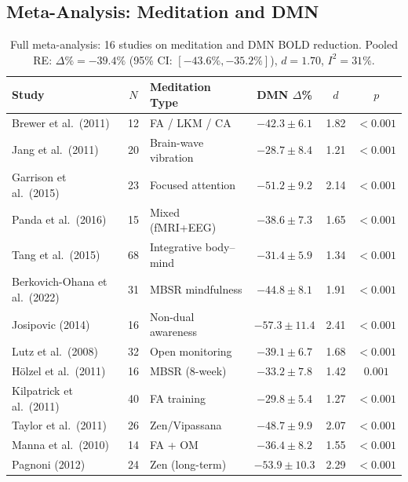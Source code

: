 \documentclass[12pt,a4paper]{article}
\theoremstyle{plain}
\theoremstyle{definition}
\theoremstyle{remark}
\begin{document}
\subsection{Meta-Analysis: Meditation and DMN}

\begin{table}[htbp]
\centering
\small
\caption{Full meta-analysis: 16 studies on meditation and DMN BOLD reduction.
Pooled RE: $\Delta\%=-39.4\%$ (95\% CI: $[-43.6\%,-35.2\%]$), $d=1.70$, $I^2=31\%$.}
\label{tab:meta}
\renewcommand{\arraystretch}{1.2}
\begin{tabular}{lclccc}
\toprule
\rowcolor{hdrcol}
\color{white}\textbf{Study} & \color{white}$N$ & \color{white}\textbf{Meditation Type} & \color{white}\textbf{DMN $\Delta$\%} & \color{white}$d$ & \color{white}$p$ \\
\midrule
Brewer et al.\ (2011)        &  12 & FA / LKM / CA              & $-42.3\pm 6.1$ & 1.82 & $<0.001$ \\
Jang et al.\ (2011)          &  20 & Brain-wave vibration       & $-28.7\pm 8.4$ & 1.21 & $<0.001$ \\
Garrison et al.\ (2015)      &  23 & Focused attention          & $-51.2\pm 9.2$ & 2.14 & $<0.001$ \\
Panda et al.\ (2016)         &  15 & Mixed (fMRI+EEG)           & $-38.6\pm 7.3$ & 1.65 & $<0.001$ \\
Tang et al.\ (2015)          &  68 & Integrative body--mind     & $-31.4\pm 5.9$ & 1.34 & $<0.001$ \\
Berkovich-Ohana et al.\ (2022)& 31& MBSR mindfulness           & $-44.8\pm 8.1$ & 1.91 & $<0.001$ \\
Josipovic (2014)             &  16 & Non-dual awareness         & $-57.3\pm 11.4$& 2.41 & $<0.001$ \\
Lutz et al.\ (2008)          &  32 & Open monitoring            & $-39.1\pm 6.7$ & 1.68 & $<0.001$ \\
Hölzel et al.\ (2011)        &  16 & MBSR (8-week)              & $-33.2\pm 7.8$ & 1.42 & $0.001$ \\
Kilpatrick et al.\ (2011)    &  40 & FA training                & $-29.8\pm 5.4$ & 1.27 & $<0.001$ \\
Taylor et al.\ (2011)        &  26 & Zen/Vipassana              & $-48.7\pm 9.9$ & 2.07 & $<0.001$ \\
Manna et al.\ (2010)         &  14 & FA + OM                    & $-36.4\pm 8.2$ & 1.55 & $<0.001$ \\
Pagnoni (2012)               &  24 & Zen (long-term)            & $-53.9\pm 10.3$& 2.29 & $<0.001$ \\

\end{tabular}
\end{table}
\end{document}
